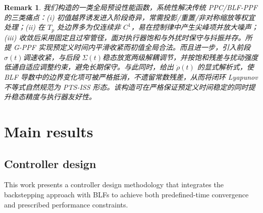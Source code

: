 \documentclass[pdflatex,sn-mathphys-num]{sn-jnl}%
\theoremstyle{thmstyleone}%
\theoremstyle{thmstyletwo}%
\newtheorem{remark}{Remark}%
\theoremstyle{thmstylethree}%
\begin{document}
\begin{remark}
	我们构造的一类全局预设性能函数，系统性解决传统 PPC/BLF-PPF 的三类痛点：(\emph{i}) 初值越界诱发进入阶段奇异，常需投影/重置/非对称缩放等权宜处理；(\emph{ii}) 在 $T_p$ 处边界多为仅连续非 $C^1$，易在控制律中产生尖峰项并放大噪声；(\emph{iii}) 收敛后采用固定且过窄管径，面对执行器饱和与外扰时保守与抖振并存。所提 G-PPF 实现预定义时间内平滑收紧而初值全局合法。而且进一步，引入前段$\sigma(t)$调速收紧，与后段 $\Sigma(t)$稳态放宽两级解耦调节，并按饱和残差与扰动强度低通自适应调整约束，避免长期保守。与此同时，给出 $\dot\rho(t)$ 的显式解析式，使 BLF 导数中的边界变化项可被严格抵消，不遗留常数残差，从而将闭环 Lyapunov 不等式自然规范为 PTS-ISS 形态。该构造可在严格保证预定义时间稳定的同时提升稳态精度与执行器友好性。

\end{remark}
	




\section{Main results}

\subsection{Controller design}
This work presents a controller design methodology that integrates the backstepping approach with BLFs to achieve both predefined-time convergence and prescribed performance constraints. 

\end{document}
